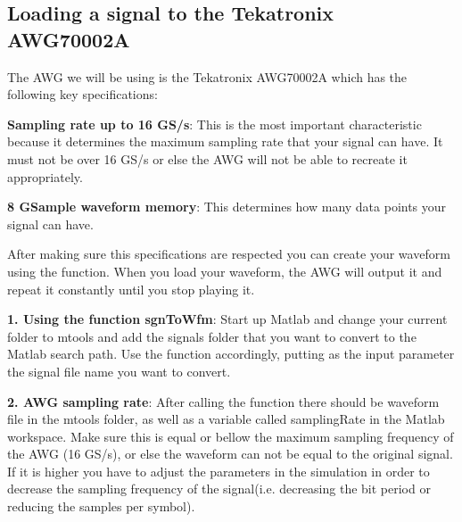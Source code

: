 %
%
%
%
%
%
%


\subsection{Loading a signal to the Tekatronix AWG70002A}

The AWG we will be using is the Tekatronix AWG70002A which has the following key specifications:
\bigskip

\textbf{Sampling rate up to 16 GS/s}: This is the most important characteristic  because it determines the maximum sampling rate that your signal can have. It must not be over 16 GS/s or else the AWG will not be able to recreate it appropriately.
\bigskip

\textbf{8 GSample waveform memory}: This determines how many data points your signal can have.
\bigskip

After making sure this specifications are respected you can create your waveform using the function. When you load your waveform, the AWG will output it and repeat it constantly until you stop playing it.
\bigskip

\textbf{1. Using the function sgnToWfm}:
Start up Matlab and change your current folder to mtools and add the signals folder that you want to convert to the Matlab search path. Use the function accordingly, putting as the input parameter the signal file name you want to convert.
\bigskip

\noindent
\textbf{2. AWG sampling rate}:
After calling the function there should be waveform file in the mtools folder, as well as a variable called samplingRate in the Matlab workspace. Make sure this is equal or bellow the maximum sampling frequency of the AWG (16 GS/s), or else the waveform can not be equal to the original signal. If it is higher you  have to adjust the parameters in the simulation in order to decrease the sampling frequency of the signal(i.e. decreasing the bit period or reducing the samples per symbol).
\bigskip

